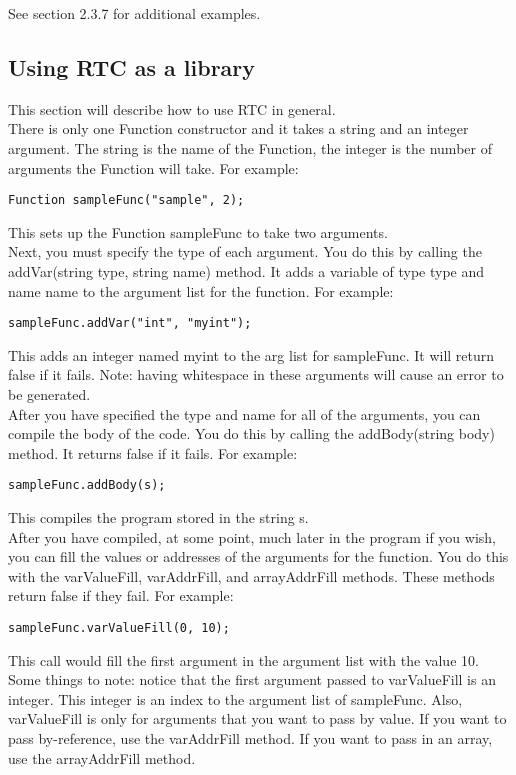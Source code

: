\documentclass{article}
\begin{document}
\noindent
See section 2.3.7 for additional examples.

\subsection{Using RTC as a library}

This section will describe how to use RTC in general. \\

\noindent
There is only one Function constructor and it takes a string and an integer
argument. The string is the name of the Function, the integer is the number of
arguments the Function will take. For example:
{\ttfamily \begin{verbatim}
Function sampleFunc("sample", 2);
\end{verbatim} }
\noindent
This sets up the Function sampleFunc to take two arguments.\\

\noindent
Next, you must specify the type of each argument. You do this by calling the
addVar(string type, string name) method. It adds a variable of type type and
name name to the argument list for the function. For example:
{\ttfamily \begin{verbatim}
sampleFunc.addVar("int", "myint");
\end{verbatim} }
\noindent
This adds an integer named myint to the arg list for sampleFunc. It will return
false if it fails. Note: having whitespace in these arguments will cause an
error to be generated. \\

\noindent
After you have specified the type and name for all of the arguments, you can
compile the body of the code. You do this by calling the addBody(string body)
method. It returns false if it fails. For example:
{\ttfamily \begin{verbatim}
sampleFunc.addBody(s);
\end{verbatim} }
\noindent
This compiles the program stored in the string s. \\

\noindent
After you have compiled, at some point, much later in the program if you wish,
you can fill the values or addresses of the arguments for the function. You
do this with the varValueFill, varAddrFill, and arrayAddrFill methods. These
methods return false if they fail. For example:
{\ttfamily \begin{verbatim}
sampleFunc.varValueFill(0, 10);
\end{verbatim} }
\noindent
This call would fill the first argument in the argument list with the value
10. Some things to note: notice that the first argument passed to varValueFill
is an integer. This integer is an index to the argument list of sampleFunc.
Also, varValueFill is only for arguments that you want to pass by value. If
you want to pass by-reference, use the varAddrFill method. If you want to pass
in an array, use the arrayAddrFill method. \\
\end{document}
